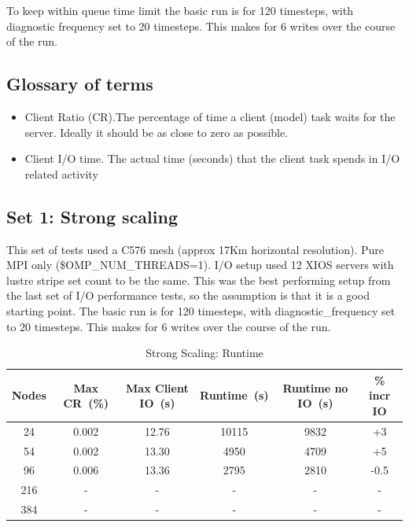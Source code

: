 To keep within queue time limit the basic run is for 120 timesteps, with diagnostic frequency set to 20 timesteps.
This makes for 6 writes over the course of the run.

\subsection{Glossary of terms}

 
\begin{itemize}
  \item Client Ratio (CR).The percentage of time a client (model) task waits for the server. Ideally it should be as close to zero as possible.
  \item Client I/O time. The actual time (seconds) that the client task spends in I/O related activity
\end{itemize} 



\subsection{Set 1: Strong scaling}

This set of tests used a C576 mesh (approx 17Km horizontal resolution). Pure MPI only (\$OMP\_NUM\_THREADS=1). 
I/O setup used 12 XIOS servers with lustre stripe set count to be the same. This was the best performing setup from
the last set of I/O performance tests, so the assumption is that it is a good starting point.
The basic run is for 120 timesteps, with diagnostic\_frequency set to 20 timesteps. This makes for 6 writes over the course of the run.

\begin{table}[ht!]
\scriptsize
  \begin{center}
    \caption{Strong Scaling: Runtime}
    \label{tab:table1}
     \begin{tabular}{|c|c|c|c|c|c|}
      \textbf{Nodes} & \textbf{Max CR~(\%)} & \textbf{Max Client IO~(s)} & \textbf{Runtime~(s)} & \textbf{Runtime no IO~(s)} & \textbf{\% incr IO}\\
      \hline
      24 & 0.002 & 12.76 & 10115 & 9832 & +3\\
      54 & 0.002 & 13.30 & 4950 & 4709 & +5\\
      96 & 0.006 & 13.36 & 2795 & 2810 & -0.5\\
      216 & - & - & - & - & - \\
      384 & - & - & - & - & - \\
    \end{tabular}
  \end{center}
\end{table}

